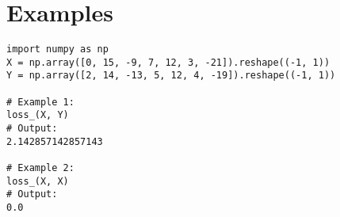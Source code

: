 \section*{Examples}
\begin{verbatim}
import numpy as np
X = np.array([0, 15, -9, 7, 12, 3, -21]).reshape((-1, 1))
Y = np.array([2, 14, -13, 5, 12, 4, -19]).reshape((-1, 1))

# Example 1:
loss_(X, Y)
# Output:
2.142857142857143

# Example 2:
loss_(X, X)
# Output:
0.0
\end{verbatim}